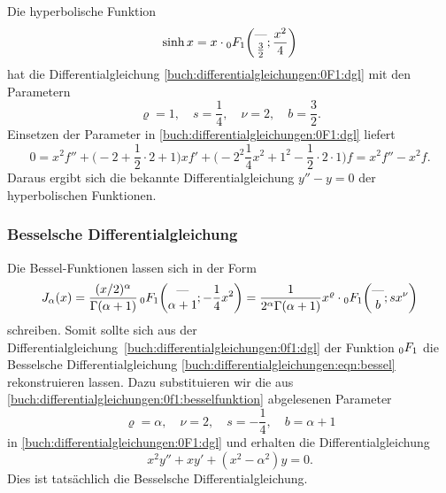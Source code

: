 \begin{beispiel}
Die hyperbolische Funktion
%
%
\[
\sinh x
=
x\cdot \mathstrut_0F_1\biggl(
\begin{matrix}\text{---}\\\frac32\end{matrix};\frac{x^2}{4}
\biggr)
\]
hat die Differentialgleichung
\eqref{buch:differentialgleichungen:0F1:dgl}
mit den Parametern
\[
\varrho=1,\quad
s=\frac14,\quad
\nu=2,\quad
b=\frac32.
\]
Einsetzen der Parameter in
\eqref{buch:differentialgleichungen:0F1:dgl}
liefert
\[
0
=
x^2f''
+
\biggl(-2+\frac12\cdot 2 + 1\biggr) xf'
+
\biggl(-2^2\frac14x^2 + 1^2 - \frac12 \cdot 2 \cdot 1\biggr) f
=
x^2f''
-x^2f.
\]
Daraus ergibt sich die bekannte Differentialgleichung
$y''-y=0$
der hyperbolischen Funktionen.
\end{beispiel}

%
%
\subsubsection{Besselsche Differentialgleichung}
Die Bessel-Funktionen lassen sich in der Form
\begin{equation}
J_\alpha(x)
=
\frac{(x/2)^\alpha}{\Gamma(\alpha+1)} \,
\mathstrut_0F_1\biggl(
\begin{matrix}\text{---}\\\alpha+1\end{matrix};-\frac14x^2
\biggr)
=
\frac{1}{2^\alpha\Gamma(\alpha+1)}
x^\varrho\cdot
\mathstrut_0F_1\biggl(
\begin{matrix}\text{---}\\b\end{matrix};sx^\nu
\biggr)
\label{buch:differentialgleichungen:0f1:besselfunktion}
\end{equation}
schreiben.
Somit sollte sich aus der
Differentialgleichung~\eqref{buch:differentialgleichungen:0f1:dgl}
der Funktion $\mathstrut_0F_1$ die Besselsche Differentialgleichung
\eqref{buch:differentialgleichungen:eqn:bessel} rekonstruieren lassen.
Dazu substituieren wir die aus
\eqref{buch:differentialgleichungen:0f1:besselfunktion}
abgelesenen Parameter
\[
\varrho=\alpha,\quad\nu=2,\quad s=-\frac14,\quad b=\alpha+1
\]
in \eqref{buch:differentialgleichungen:0F1:dgl} und erhalten
die Differentialgleichung
\begin{equation}
x^2y''
+
xy'
+
(x^2 - \alpha^2)y
=
0.
\label{buch:differentialgleichungen:0F1:besseldgl}
\end{equation}
Dies ist tatsächlich die Besselsche Differentialgleichung.

